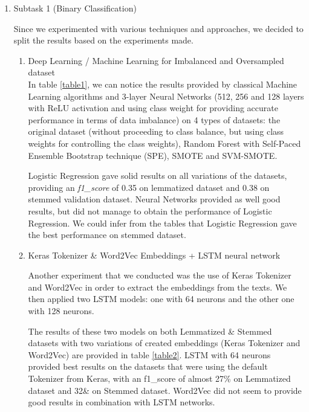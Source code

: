 \documentclass[11pt]{article}
\begin{document}
\begin{enumerate}

	\item Subtask 1 (Binary Classification)

	      Since we experimented with various techniques and approaches, we decided to split the results based on the experiments made.

	      \begin{enumerate}
		      \item Deep Learning / Machine Learning for Imbalanced and Oversampled dataset
		            \\
		            In table \ref{table1}, we can notice the results provided
		            by classical Machine Learning algorithms and 3-layer Neural
		            Networks (512, 256 and 128 layers with ReLU activation and
		            using class weight for providing accurate performance in
		            terms of data imbalance) on 4 types of datasets: the
		            original dataset (without proceeding to class balance, but
		            using class weights for controlling the class weights),
		            Random Forest with Self-Paced Ensemble Bootstrap technique
		            (SPE), SMOTE and SVM-SMOTE.

		            Logistic Regression gave solid results on all variations of
		            the datasets, providing an \textit{f1\_score} of 0.35 on
		            lemmatized dataset and 0.38 on stemmed validation dataset.
		            Neural Networks provided as well good results, but did not
		            manage to obtain the performance of Logistic Regression. We
		            could infer from the tables that Logistic Regression gave
		            the best performance on stemmed dataset.





		      \item Keras Tokenizer \& Word2Vec Embeddings + LSTM
		            neural network

		            Another experiment that we conducted was the use of Keras
		            Tokenizer and Word2Vec in order to extract the embeddings
		            from the texts. We then applied two LSTM models: one with
		            64 neurons and the other one with 128 neurons.

		            The results of these two models on both Lemmatized \&
		            Stemmed datasets with two variations of created embeddings
		            (Keras Tokenizer and Word2Vec) are provided in table
		            \ref{table2}. LSTM with 64 neurons provided best results on
		            the datasets that were using the default Tokenizer from
		            Keras, with an f1\_score of almost 27\% on Lemmatized
		            dataset and 32\& on Stemmed dataset. Word2Vec did not seem
		            to provide good results in combination with LSTM networks.




\end{enumerate}
\end{enumerate}
\end{document}
